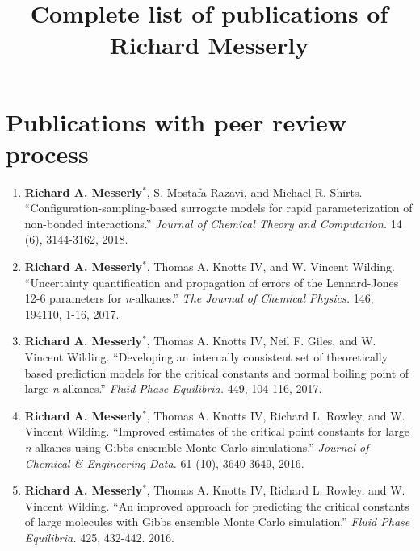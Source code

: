 \documentclass[12pt]{article}
\title{Complete list of publications of Richard Messerly}
\date{}
\begin{document}
\maketitle



\section{Publications with peer review process}

\begin{enumerate}
	
\item \textbf{Richard A. Messerly}$^*$, S. Mostafa Razavi, and Michael R. Shirts. ``Configuration-sampling-based surrogate models for rapid parameterization of non-bonded interactions.'' \textit{Journal of Chemical Theory and Computation.} 14 (6), 3144-3162, 2018.
	
\item \textbf{Richard A. Messerly}$^*$, Thomas A. Knotts IV, and W. Vincent Wilding. ``Uncertainty quantification and propagation of errors of the Lennard-Jones 12-6 parameters for \textit{n}-alkanes.'' \textit{The Journal of Chemical Physics.} 146, 194110, 1-16, 2017.

\item \textbf{Richard A. Messerly}$^*$, Thomas A. Knotts IV, Neil F. Giles, and W. Vincent Wilding. ``Developing an internally consistent set of theoretically based prediction models for the critical constants and normal boiling point of large \textit{n}-alkanes.'' \textit{Fluid Phase Equilibria.} 449, 104-116, 2017.

\item \textbf{Richard A. Messerly}$^*$, Thomas A. Knotts IV, Richard L. Rowley, and W. Vincent Wilding. ``Improved estimates of the critical point constants for large \textit{n}-alkanes using Gibbs ensemble Monte Carlo simulations.'' \textit{Journal of Chemical \& Engineering Data.} 61 (10), 3640-3649, 2016.

\item \textbf{Richard A. Messerly}$^*$, Thomas A. Knotts IV, Richard L. Rowley, and W. Vincent Wilding. ``An improved approach for predicting the critical constants of large molecules with Gibbs ensemble Monte Carlo simulation.'' \textit{Fluid Phase Equilibria.} 425, 432-442. 2016.


\end{enumerate}
\end{document}
